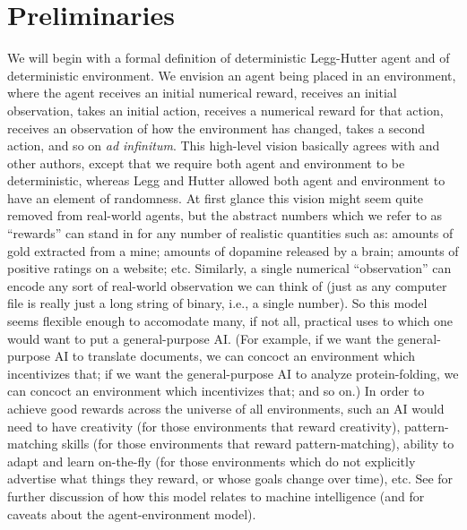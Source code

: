 \documentclass[twoside,11pt]{article}
\begin{document}
\section{Preliminaries}
\label{preliminariessection}

We will begin with a formal definition of deterministic Legg-Hutter agent and of
deterministic environment.
We envision an agent being placed in an environment, where the agent
receives an initial numerical reward, receives an initial observation, takes an initial
action, receives a numerical reward for that action, receives an observation of how the
environment has changed, takes a second action, and so on \emph{ad infinitum}.
This high-level vision basically agrees with \citet{hutter2007}
and other authors,
except that we require both agent and environment to
be deterministic, whereas Legg and Hutter allowed both agent and environment to have
an element of randomness.
At first glance this vision might seem quite removed from real-world
agents, but the abstract numbers which we refer to as ``rewards'' can
stand in for any number of realistic quantities such as: amounts of gold
extracted from a mine; amounts of dopamine released by a brain; amounts of positive
ratings on a website; etc. Similarly, a single numerical ``observation'' can
encode any sort of real-world observation we can think of (just as any computer file
is really just a long string of binary, i.e., a single number).
So this model seems flexible enough to accomodate many, if not all, practical uses
to which one would want to put a general-purpose AI.
(For example, if we want the general-purpose AI to translate documents, we can concoct
an environment which incentivizes that; if we want the general-purpose AI to analyze
protein-folding, we can concoct an environment which incentivizes that; and so on.)
In order to achieve good rewards across the universe of all environments,
such an AI would need to have creativity (for those environments that reward creativity),
pattern-matching skills (for those environments that reward pattern-matching),
ability to adapt and learn on-the-fly (for those environments which do not explicitly
advertise what things they reward, or whose goals change over time), etc.
See \citet{hutter2007} for further discussion of how this model relates
to machine intelligence (and for caveats about the agent-environment
model).
\end{document}
